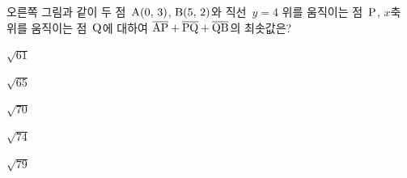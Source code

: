 \noindent\begin{minipage}[t]{0.58\linewidth}\vspace{0pt}\raggedright 오른쪽 그림과 같이 두 점~$\mathrm{A}(0,\mkern3mu 3)$, $\mathrm{B}(5,\mkern3mu 2)$와 직선~$y=4$ 위를 움직이는 점~$\mathrm{P}$, $x$축 위를 움직이는 점~$\mathrm{Q}$에 대하여 $\overline{\mathrm{AP}}+\overline{\mathrm{PQ}}+\overline{\mathrm{QB}}$의 최솟값은?\end{minipage}\hfill\begin{minipage}[t]{0.4\linewidth}\vspace{0pt}\centering \resizebox{\ifdim\width>\linewidth\linewidth\else\width\fi}{!}{}\end{minipage}\par
\begin{choices32}{\rule[-3ex]{0pt}{8ex}$\sqrt{61}$}{\rule[-3ex]{0pt}{8ex}$\sqrt{65}$}{\rule[-3ex]{0pt}{8ex}$\sqrt{70}$}{\rule[-3ex]{0pt}{8ex}$\sqrt{74}$}{\rule[-3ex]{0pt}{8ex}$\sqrt{79}$}\end{choices32}
